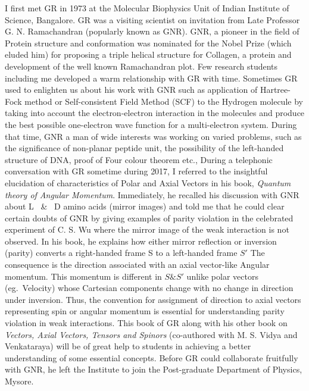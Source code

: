 I first met GR in 1973 at the Molecular Biophysics Unit of Indian Institute of Science, Bangalore. GR was a visiting scientist on invitation from Late Professor G. N. Ramachandran (popularly known as GNR). GNR, a pioneer in the field of Protein structure and conformation was nominated for the Nobel Prize (which eluded him) for proposing a triple helical structure for Collagen, a protein and development of the well known Ramachandran plot. Few research students including me developed a warm relationship with GR with time. Sometimes GR used to enlighten us about his work with GNR such as application of Hartree-Fock method or Self-consistent Field Method (SCF) to the Hydrogen molecule by taking into account the electron-electron interaction in the molecules and produce the best possible one-electron wave function for a multi-electron system. During that time, GNR a man of wide interests was working on varied problems, such as the significance of non-planar peptide unit, the possibility of the left-handed structure of DNA, proof of Four colour theorem etc., During a telephonic conversation with GR sometime during 2017, I referred to the insightful elucidation of characteristics of Polar and Axial Vectors in his book, \textit{Quantum theory of Angular Momentum}. Immediately, he recalled his discussion with GNR about L ~\&~ D amino acids (mirror images) and told me that he could clear certain doubts of GNR by giving examples of parity violation in the celebrated experiment of C. S. Wu where the mirror image of the weak interaction is not observed. In his book, he explains how either mirror reflection or inversion (parity) converts a right-handed frame S to a left-handed frame $S'$ The consequence is the direction associated with an axial vector-like Angular momentum. This momentum is different in $S \& S'$ unlike polar vectors (eg.\ Velocity) whose Cartesian components change with no change in direction under inversion. Thus, the convention for assignment of direction to axial vectors representing spin or angular momentum is essential for understanding parity violation in weak interactions. This book of GR along with his other book on \textit{Vectors, Axial Vectors, Tensors and Spinors} (co-authored with M. S. Vidya and Venkataraya) will be of great help to students in achieving a better understanding of some essential concepts. Before GR could collaborate fruitfully with GNR, he left the Institute to join the Post-graduate Department of Physics, Mysore.  

